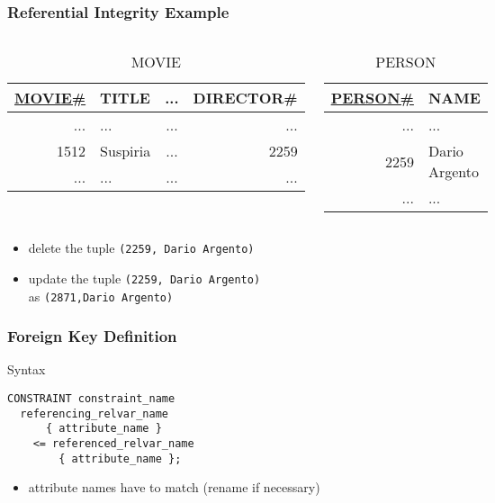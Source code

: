 \documentclass[dvipsnames]{beamer}
\theoremstyle{plain}
\begin{document}
\begin{frame}
  \frametitle{Referential Integrity Example}

  \begin{example}
    \begin{columns}
      \begin{tiny}
      \begin{table}
        \caption{MOVIE}
        \begin{tabular}{|r|l|c|r|}\hline
\underline{MOVIE\#} & TITLE & ... & DIRECTOR\#\\[2pt]\hline\hline
             ... & ...      & ... &        ...\\\hline
            1512 & Suspiria & ... &       2259\\\hline
             ... & ...      & ... &        ...\\\hline
        \end{tabular}
      \end{table}
      \end{tiny}

      \begin{tiny}
      \begin{table}
        \caption{PERSON}
        \begin{tabular}{|r|l|}\hline
\underline{PERSON\#} & NAME\\[2pt]\hline\hline
        ... & ...          \\\hline
       2259 & Dario Argento\\\hline
        ... & ...          \\\hline
        \end{tabular}
      \end{table}
      \end{tiny}
    \end{columns}

    \begin{itemize}
      \item delete the tuple \texttt{(2259, Dario Argento)}
      \item update the tuple \texttt{(2259, Dario Argento)}\\
        as \texttt{(2871,Dario Argento)}
    \end{itemize}
  \end{example}
\end{frame}

\begin{frame}[fragile]
  \frametitle{Foreign Key Definition}

  \begin{block}{Syntax}
    \begin{lstlisting}
CONSTRAINT constraint_name
  referencing_relvar_name
      { attribute_name }
    <= referenced_relvar_name
        { attribute_name };
    \end{lstlisting}
  \end{block}

  \begin{itemize}
    \item attribute names have to match (rename if necessary)
  \end{itemize}
\end{frame}
\end{document}
